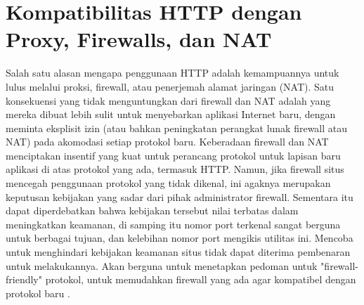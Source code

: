 \section{Kompatibilitas HTTP dengan Proxy, Firewalls, dan NAT}
Salah satu alasan mengapa penggunaan HTTP adalah kemampuannya untuk lulus melalui proksi, firewall, atau penerjemah alamat jaringan (NAT). Satu konsekuensi yang tidak menguntungkan dari firewall dan NAT adalah yang mereka dibuat lebih sulit untuk menyebarkan aplikasi Internet baru, dengan meminta eksplisit izin (atau bahkan peningkatan perangkat lunak firewall atau NAT) pada akomodasi setiap protokol baru. Keberadaan firewall dan NAT menciptakan insentif yang kuat untuk perancang protokol untuk lapisan baru aplikasi di atas protokol yang ada, termasuk HTTP. Namun, jika firewall situs mencegah penggunaan protokol yang tidak dikenal, ini agaknya merupakan keputusan kebijakan yang sadar dari pihak administrator firewall. Sementara itu dapat diperdebatkan bahwa kebijakan tersebut nilai terbatas dalam meningkatkan keamanan, di samping itu nomor port terkenal sangat berguna untuk berbagai tujuan, dan kelebihan nomor port mengikis utilitas ini. Mencoba untuk menghindari kebijakan keamanan situs tidak dapat diterima pembenaran untuk melakukannya. Akan berguna untuk menetapkan pedoman untuk "firewall-friendly" protokol, untuk memudahkan firewall yang ada agar kompatibel dengan protokol baru
\cite{moore2002use}.


